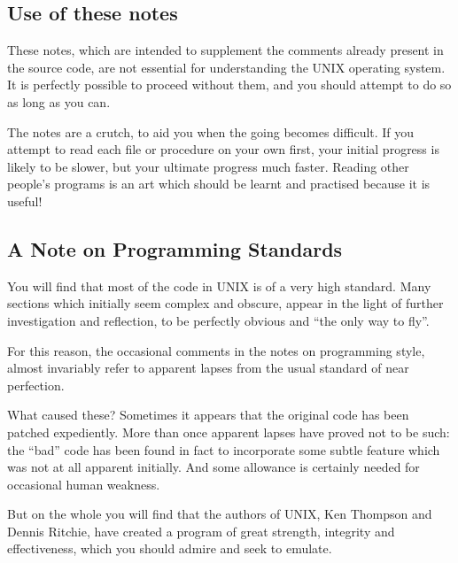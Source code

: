 \subsection{Use of these notes}

These notes, which are intended to supplement
the comments already present in
the source code, are not essential for
understanding the UNIX operating system.
It is perfectly possible to
proceed without them, and you should
attempt to do so as long as you can.

The notes are a crutch, to aid you when
the going becomes difficult. If you
attempt to read each file or procedure
on your own first, your initial progress
is likely to be slower, but your
ultimate progress much faster. Reading
other people's programs is an art which
should be learnt and practised
because it is useful!

\subsection{A Note on Programming Standards}

You will find that most of the code in
UNIX is of a very high standard. Many
sections which initially seem complex
and obscure, appear in the light of
further investigation and reflection,
to be perfectly obvious and ``the only
way to fly''.

For this reason, the occasional comments
in the notes on programming
style, almost invariably refer to
apparent lapses from the usual standard
of near perfection.

What caused these? Sometimes it appears
that the original code has been patched
expediently. More than once apparent
lapses have proved not to be such: the
``bad'' code has been found in fact to
incorporate some subtle feature which
was not at all apparent initially. And
some allowance is certainly needed for
occasional human weakness.

But on the whole you will find that the
authors of UNIX, Ken Thompson and
Dennis Ritchie, have created a program
of great strength, integrity and effectiveness,
which you should admire and seek to emulate.
